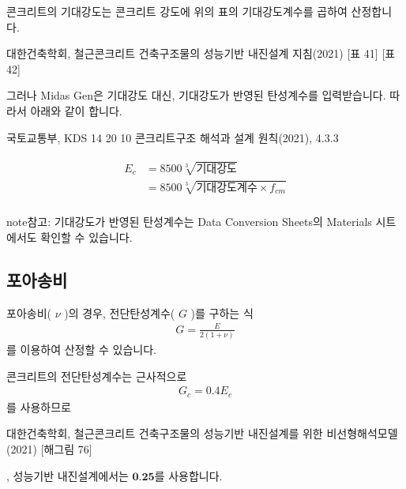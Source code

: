 \documentclass[a4paper,11pt,korean,openany,oneside]{sphinxmanual}
\begin{document}
\sphinxAtStartPar
콘크리트의 기대강도는 콘크리트 강도에 위의 표의 기대강도계수를 곱하여 산정합니다. %
\begin{footnote}[2]\sphinxAtStartFootnote
대한건축학회, 철근콘크리트 건축구조물의 성능기반 내진설계 지침(2021) {[}표 4\sphinxhyphen{}1{]} {[}표 4\sphinxhyphen{}2{]}
%
\end{footnote}
그러나 Midas Gen은 기대강도 대신, 기대강도가 반영된 탄성계수를 입력받습니다.
따라서 아래와 같이 합니다. %
\begin{footnote}[3]\sphinxAtStartFootnote
국토교통부, KDS 14 20 10 콘크리트구조 해석과 설계 원칙(2021), 4.3.3
%
\end{footnote}
\begin{align*}\!\begin{aligned}
E_c &= 8500 \sqrt[3]{기대강도}\\
&= 8500 \sqrt[3]{기대강도계수 \times f_{cm}}\\
\end{aligned}\end{align*}
\begin{sphinxadmonition}{note}{참고:}
\sphinxAtStartPar
기대강도가 반영된 탄성계수는 Data Conversion Sheets의 Materials 시트에서도 확인할 수 있습니다.
\end{sphinxadmonition}


\subsection{포아송비}
\label{\detokenize{1_material_setting:id6}}
\sphinxAtStartPar
포아송비( \(\nu\) )의 경우, 전단탄성계수( \(G\) )를 구하는 식
\begin{equation}\label{equation:1_material_setting:shear_modulus_1}
\begin{split}G = \frac{E}{2(1+\nu)}\end{split}
\end{equation}
\sphinxAtStartPar
를 이용하여 산정할 수 있습니다.

\sphinxAtStartPar
콘크리트의 전단탄성계수는 근사적으로
\begin{equation}\label{equation:1_material_setting:shear_modulus_2}
\begin{split}G_c = 0.4E_c\end{split}
\end{equation}
\sphinxAtStartPar
를 사용하므로 %
\begin{footnote}[4]\sphinxAtStartFootnote
대한건축학회, 철근콘크리트 건축구조물의 성능기반 내진설계를 위한 비선형해석모델(2021) {[}해그림 7\sphinxhyphen{}6{]}
%
\end{footnote}, 성능기반 내진설계에서는  \(\textbf{0.25}\)를 사용합니다.
\end{document}
